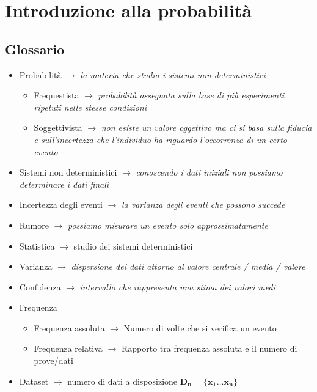 \documentclass[]{article}
\begin{document}
    \tableofcontents
    \newpage
    \section{Introduzione alla probabilità}    
    \subsection{Glossario}
    \begin{itemize}
        \item Probabilità $\rightarrow$ \textit{la materia che studia i sistemi non deterministici}
        \begin{itemize}
            \item Frequestista $\rightarrow $ \textit{probabilità assegnata sulla base di più esperimenti ripetuti nelle stesse condizioni}
            \item Soggettivista $\rightarrow $ \textit{non esiste un valore oggettivo ma ci si basa sulla fiducia e sull'incertezza che l'individuo ha riguardo l'occorrenza di un certo evento}
        \end{itemize}
        \item Sistemi non deterministici $\rightarrow$ \textit{conoscendo i dati iniziali non possiamo determinare i dati finali}
        \item Incertezza degli eventi $\rightarrow$ \textit{la varianza degli eventi che possono succede}
        \item Rumore $\rightarrow$ \textit{possiamo misurare un evento solo approssimatamente}
        \item Statistica $\rightarrow$ studio dei sistemi deterministici
        \item Varianza $\rightarrow$ \textit{dispersione dei dati attorno al valore centrale / media / valore}
        \item Confidenza $\rightarrow$ \textit{intervallo che rappresenta una stima dei valori medi}
        \item Frequenza
        \begin{itemize}
            \item Frequenza assoluta $\rightarrow$ Numero di volte che si verifica un evento
            \item Frequenza relativa $\rightarrow$ Rapporto tra frequenza assoluta e il numero di prove/dati
        \end{itemize}
        \item Dataset $\rightarrow$ numero di dati a disposizione $\boldsymbol{D_n = \{ x_1 \ldots x_n \}} $

\end{itemize}
\end{document}
